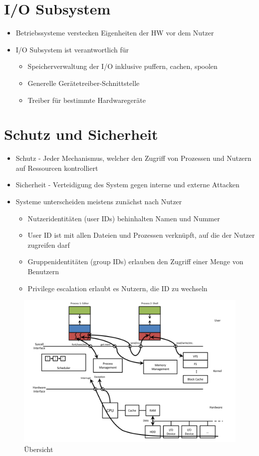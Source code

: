 \documentclass[a4paper]{scrreprt}
\begin{document}
\section{I/O Subsystem}
\begin{itemize}
	\item Betriebssysteme verstecken Eigenheiten der HW vor dem Nutzer
	\item I/O Subsystem ist verantwortlich für
		\begin{itemize}
			\item Speicherverwaltung der I/O inklusive puffern, cachen, spoolen
			\item Generelle Gerätetreiber-Schnittstelle
			\item Treiber für bestimmte Hardwaregeräte
		\end{itemize}
\end{itemize}

\section{Schutz und Sicherheit}
\begin{itemize}
	\item Schutz - Jeder Mechanismus, welcher den Zugriff von Prozessen und Nutzern auf Ressourcen kontrolliert
	\item Sicherheit - Verteidigung des System gegen interne und externe Attacken
	\item Systeme unterscheiden meistens zunächst nach Nutzer
		\begin{itemize}
			\item Nutzeridentitäten (user IDs) behinhalten Namen und Nummer
			\item User ID ist mit allen Dateien und Prozessen verknüpft, auf die der Nutzer zugreifen darf
			\item Gruppenidentitäten (group IDs) erlauben den Zugriff einer Menge von Benutzern
			\item Privilege escalation erlaubt es Nutzern, die ID zu wechseln
		\end{itemize}
\end{itemize}

\begin{figure}[ht]
\centering
\includegraphics[scale=0.5]{graphics/big_picture.png}
\caption{Übersicht}
\end{figure}
\end{document}
